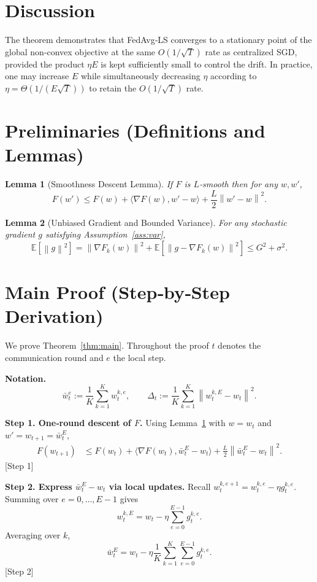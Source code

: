 \documentclass{article}
\newtheorem{lemma}{Lemma}
\newcommand{\E}{\mathbb{E}}
\newcommand{\norm}[1]{\left\|#1\right\|}
\newcommand{\iprod}[2]{\langle #1,#2\rangle}
\begin{document}
\section*{Discussion}
The theorem demonstrates that FedAvg‑LS converges to a stationary point of the
global non‑convex objective at the same $O(1/\sqrt{T})$ rate as centralized SGD,
provided the product $\eta E$ is kept sufficiently small to control the drift.
In practice, one may increase $E$ while simultaneously decreasing $\eta$
according to $\eta = \Theta(1/(E\sqrt{T}))$ to retain the $O(1/\sqrt{T})$ rate.

\newpage
\section*{Preliminaries (Definitions and Lemmas)}
\begin{lemma}[Smoothness Descent Lemma]\label{lem:smooth}
If $F$ is $L$‑smooth then for any $w,w'$,
\[
F(w')\le F(w)+\iprod{\nabla F(w)}{w'-w}+\frac{L}{2}\norm{w'-w}^2 .
\]
\end{lemma}
\begin{lemma}[Unbiased Gradient and Bounded Variance]\label{lem:var}
For any stochastic gradient $g$ satisfying Assumption~\ref{ass:var},
\[
\E\!\left[\norm{g}^2\right]
= \norm{\nabla F_k(w)}^2+\E\!\left[\norm{g-\nabla F_k(w)}^2\right]
\le G^2+\sigma^2 .
\]
\end{lemma}

\section*{Main Proof (Step‑by‑Step Derivation)}
We prove Theorem~\ref{thm:main}.  Throughout the proof $t$ denotes the
communication round and $e$ the local step.

\noindent\textbf{Notation.}
\[
\bar w_{t}^{e}:=\frac{1}{K}\sum_{k=1}^{K} w_{t}^{k,e},
\qquad
\Delta_t:=\frac{1}{K}\sum_{k=1}^{K}\norm{w_{t}^{k,E}-w_t}^2 .
\]

\noindent\textbf{Step 1.  One‑round descent of $F$.}
Using Lemma~\ref{lem:smooth} with $w=w_t$ and $w'=w_{t+1}=\bar w_{t}^{E}$,
\begin{align}
F(w_{t+1})
&\le F(w_t)+\iprod{\nabla F(w_t)}{\bar w_{t}^{E}-w_t}
   +\frac{L}{2}\norm{\bar w_{t}^{E}-w_t}^2 .
\tag{1}
\end{align}
[Step 1]

\noindent\textbf{Step 2.  Express $\bar w_{t}^{E}-w_t$ via local updates.}
Recall $w_{t}^{k,e+1}=w_{t}^{k,e}-\eta g_{t}^{k,e}$.
Summing over $e=0,\dots,E-1$ gives
\[
w_{t}^{k,E}=w_t-\eta\sum_{e=0}^{E-1}g_{t}^{k,e}.
\]
Averaging over $k$,
\[
\bar w_{t}^{E}=w_t-\eta\frac{1}{K}\sum_{k=1}^{K}\sum_{e=0}^{E-1} g_{t}^{k,e}.
\tag{2}
\]
[Step 2]
\end{document}

